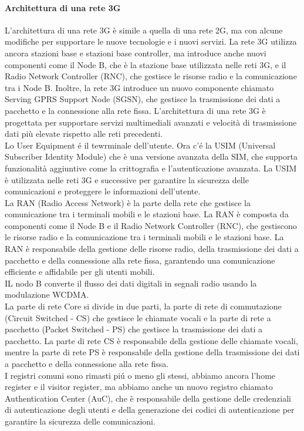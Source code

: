 \paragraph{Architettura di una rete 3G}
L'architettura di una rete 3G è simile a quella di una rete 2G, ma con alcune modifiche per supportare le nuove tecnologie e i nuovi servizi. La rete 3G utilizza ancora stazioni base e stazioni base controller, ma introduce anche nuovi componenti come il Node B, che è la stazione base utilizzata nelle reti 3G, e il Radio Network Controller (RNC), che gestisce le risorse radio e la comunicazione tra i Node B. Inoltre, la rete 3G introduce un nuovo componente chiamato Serving GPRS Support Node (SGSN), che gestisce la trasmissione dei dati a pacchetto e la connessione alla rete fissa. L'architettura di una rete 3G è progettata per supportare servizi multimediali avanzati e velocità di trasmissione dati più elevate rispetto alle reti precedenti.\\
Lo User Equipment é il tewrminale dell'utente. Ora c'é la USIM (Universal Subscriber Identity Module) che è una versione avanzata della SIM, che supporta funzionalità aggiuntive come la crittografia e l'autenticazione avanzata. La USIM è utilizzata nelle reti 3G e successive per garantire la sicurezza delle comunicazioni e proteggere le informazioni dell'utente.\\
La RAN (Radio Access Network) è la parte della rete che gestisce la comunicazione tra i terminali mobili e le stazioni base. La RAN è composta da componenti come il Node B e il Radio Network Controller (RNC), che gestiscono le risorse radio e la comunicazione tra i terminali mobili e le stazioni base. La RAN è responsabile della gestione delle risorse radio, della trasmissione dei dati a pacchetto e della connessione alla rete fissa, garantendo una comunicazione efficiente e affidabile per gli utenti mobili.\\
IL nodo B converte il flusso dei dati digitali in segnali radio usando la modulazione WCDMA. \\
La parte di rete Core si divide in due parti, la parte di rete di commutazione (Circuit Switched - CS) che gestisce le chiamate vocali e la parte di rete a pacchetto (Packet Switched - PS) che gestisce la trasmissione dei dati a pacchetto. La parte di rete CS è responsabile della gestione delle chiamate vocali, mentre la parte di rete PS è responsabile della gestione della trasmissione dei dati a pacchetto e della connessione alla rete fissa.\\
I registri comuni sono rimasti piú o meno gli stessi, abbiamo ancora l'home register e il visitor register, ma abbiamo anche un nuovo registro chiamato Authentication Center (AuC), che è responsabile della gestione delle credenziali di autenticazione degli utenti e della generazione dei codici di autenticazione per garantire la sicurezza delle comunicazioni.\\

